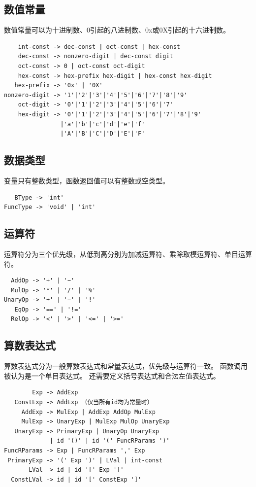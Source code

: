 \documentclass[UTF8,a4paper,10pt]{ctexart}
\begin{document}
    \subsection{数值常量}
    数值常量可以为十进制数、0引起的八进制数、0x或0X引起的十六进制数。
    \begin{lstlisting}
    int-const -> dec-const | oct-const | hex-const
    dec-const -> nonzero-digit | dec-const digit
    oct-const -> 0 | oct-const oct-digit
    hex-const -> hex-prefix hex-digit | hex-const hex-digit
   hex-prefix -> '0x' | '0X'
nonzero-digit -> '1'|'2'|'3'|'4'|'5'|'6'|'7'|'8'|'9'
    oct-digit -> '0'|'1'|'2'|'3'|'4'|'5'|'6'|'7'
    hex-digit -> '0'|'1'|'2'|'3'|'4'|'5'|'6'|'7'|'8'|'9'
                |'a'|'b'|'c'|'d'|'e'|'f'
                |'A'|'B'|'C'|'D'|'E'|'F'
    \end{lstlisting}

    \subsection{数据类型}
    变量只有整数类型，函数返回值可以有整数或空类型。
    \begin{lstlisting}
   BType -> 'int'
FuncType -> 'void' | 'int'
    \end{lstlisting}

    \subsection{运算符}
    运算符分为三个优先级，从低到高分别为加减运算符、乘除取模运算符、单目运算符。
    \begin{lstlisting}
  AddOp -> '+' | '−'
  MulOp -> '*' | '/' | '%'
UnaryOp -> '+' | '−' | '!'
   EqOp -> '==' | '!='
  RelOp -> '<' | '>' | '<=' | '>='
    \end{lstlisting}
    
    \subsection{算数表达式}
    算数表达式分为一般算数表达式和常量表达式，优先级与运算符一致。
    函数调用被认为是一个单目表达式。
    还需要定义括号表达式和合法左值表达式。
    \begin{lstlisting}
        Exp -> AddExp
   ConstExp -> AddExp （仅当所有id均为常量时）
     AddExp -> MulExp | AddExp AddOp MulExp
     MulExp -> UnaryExp | MulExp MulOp UnaryExp
   UnaryExp -> PrimaryExp | UnaryOp UnaryExp
             | id '()' | id '(' FuncRParams ')'
FuncRParams -> Exp | FuncRParams ',' Exp
 PrimaryExp -> '(' Exp ')' | LVal | int-const
       LVal -> id | id '[' Exp ']'
  ConstLVal -> id | id '[' ConstExp ']'
    \end{lstlisting}
\end{document}
